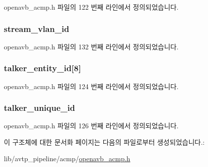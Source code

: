 openavb\+\_\+acmp.\+h 파일의 122 번째 라인에서 정의되었습니다.

\subsubsection[{\texorpdfstring{stream\+\_\+vlan\+\_\+id}{stream_vlan_id}}]{ stream\+\_\+vlan\+\_\+id}\hypertarget{structopenavb__acmp___a_c_m_p_command_response__t_a31db70d552fc6f5d35875430fca593e6}{}\label{structopenavb__acmp___a_c_m_p_command_response__t_a31db70d552fc6f5d35875430fca593e6}


openavb\+\_\+acmp.\+h 파일의 132 번째 라인에서 정의되었습니다.

\subsubsection[{\texorpdfstring{talker\+\_\+entity\+\_\+id}{talker_entity_id}}]{ talker\+\_\+entity\+\_\+id\mbox{[}8\mbox{]}}\hypertarget{structopenavb__acmp___a_c_m_p_command_response__t_a9a599b9c25c2171c3e76f269d9a04f51}{}\label{structopenavb__acmp___a_c_m_p_command_response__t_a9a599b9c25c2171c3e76f269d9a04f51}


openavb\+\_\+acmp.\+h 파일의 124 번째 라인에서 정의되었습니다.

\subsubsection[{\texorpdfstring{talker\+\_\+unique\+\_\+id}{talker_unique_id}}]{ talker\+\_\+unique\+\_\+id}\hypertarget{structopenavb__acmp___a_c_m_p_command_response__t_a545e994bde6218210bb41265ac298837}{}\label{structopenavb__acmp___a_c_m_p_command_response__t_a545e994bde6218210bb41265ac298837}


openavb\+\_\+acmp.\+h 파일의 126 번째 라인에서 정의되었습니다.



이 구조체에 대한 문서화 페이지는 다음의 파일로부터 생성되었습니다.\+:\begin{DoxyCompactItemize}
\item 
lib/avtp\+\_\+pipeline/acmp/\hyperlink{openavb__acmp_8h}{openavb\+\_\+acmp.\+h}\end{DoxyCompactItemize}
